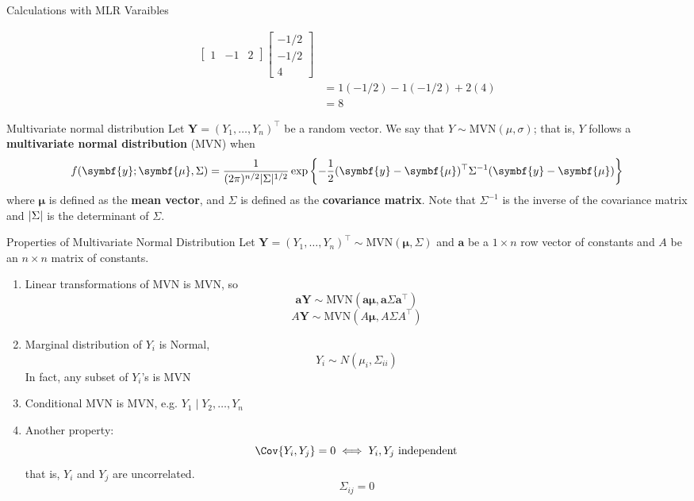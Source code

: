 \begin{Example}{Calculations with MLR Varaibles}{}
\begin{enumerate}[label=(\roman*)]
\begin{align*}
\begin{bmatrix}
                      1 & -1 & 2
                  \end{bmatrix}
                  \begin{bmatrix}
                      -1/2 \\
                      -1/2 \\
                      4
                  \end{bmatrix}                  \\
                   & =1(-1/2)-1(-1/2)+2(4)                    \\
                   & =8
              \end{align*}
    \end{enumerate}
\end{Example}
\begin{Definition}{Multivariate normal distribution}{}
    Let $ \symbf{Y}=(Y_1,\ldots,Y_n)^\top $
    be a random vector. We say
    that $ Y \sim \text{MVN}(\mu,\sigma) $; that is,
    $ Y $ follows a \textbf{multivariate normal distribution} (MVN) when
    \[ f(\symbf{y};\symbf{\mu},\Sigma)=
        \frac{1}{(2\pi)^{n/2}\abs{\Sigma}^{1/2}}
        \exp\left\{ -\frac{1}{2}(\symbf{y}-\symbf{\mu})^\top
        \Sigma^{-1}(\symbf{y}-\symbf{\mu}) \right\}  \]
    where $ \symbf{\mu} $ is defined as the \textbf{mean vector},
    and $ \Sigma $ is defined as the \textbf{covariance matrix}.
    Note that $ \Sigma^{-1} $ is the inverse of the covariance matrix
    and $ \lvert\Sigma\rvert $ is the determinant of $ \Sigma $.
\end{Definition}

\begin{Theorem}{Properties of Multivariate Normal Distribution}{}
    Let $ \symbf{Y}=(Y_1,\ldots,Y_n)^\top \sim \text{MVN}(\symbf{\mu},\Sigma) $
    and $ \symbf{a} $ be a $ 1\times n $ row vector of constants
    and $ A $ be an $ n\times n  $ matrix of constants.
    \begin{enumerate}[label=(\arabic*)]
        \item Linear transformations of MVN is MVN, so
              \[ \symbf{a}\symbf{Y}\sim \text{MVN}(\symbf{a}\symbf{\mu},\symbf{a}
                  \Sigma\symbf{a}^\top) \]
              \[ A\symbf{Y} \sim \text{MVN}(A\symbf{\mu},A\Sigma A^\top) \]
        \item Marginal distribution of $ Y_i $ is
              Normal,
              \[ Y_i \sim N(\mu_i,\Sigma_{ii}) \]
              In fact, any subset of $ Y_i $'s is MVN
        \item Conditional MVN is MVN, e.g. $ Y_1\mid Y_2,\ldots,Y_n $
        \item Another property:
              \[ \Cov{Y_i,Y_j}=0\iff Y_i,Y_j\text{ independent} \]
              that is, $ Y_i $ and $ Y_j $ are uncorrelated.
              \[ \Sigma_{ij}=0 \]
    \end{enumerate}
\end{Theorem}
